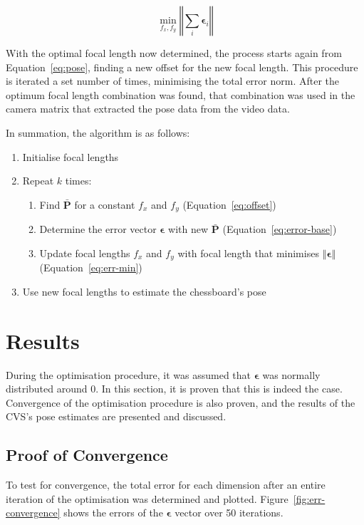 \begin{equation}
  \label{eq:err-min}
  \min_{f_x, f_y}\left \Vert \sum_i  \bm{\epsilon}_i \right \Vert
\end{equation}

With the optimal focal length now determined, the process starts again from Equation~\ref{eq:pose}, finding a new offset for the new focal length. This procedure is iterated a set number of times, minimising the total error norm. After the optimum focal length combination was found, that combination was used in the camera matrix that extracted the pose data from the video data.

In summation, the algorithm is as follows:

\begin{enumerate}
  \item Initialise focal lengths
  \item Repeat $k$ times:
  \begin{enumerate}
    \item Find $\bar{\bm{P}}$ for a constant $f_x$ and $f_y$ (Equation~\ref{eq:offset})
    \item Determine the error vector $\bm{\epsilon}$ with new $\bar{\bm{P}}$ (Equation~\ref{eq:error-base})
    \item Update focal lengths $f_x$ and $f_y$ with focal length that minimises $\left \Vert \bm{\epsilon} \right \Vert$ (Equation~\ref{eq:err-min})
  \end{enumerate}
  \item Use new focal lengths to estimate the chessboard's pose
\end{enumerate}

\section{Results}

During the optimisation procedure, it was assumed that $\bm{\epsilon}$ was normally distributed around 0. In this section, it is proven that this is indeed the case. Convergence of the optimisation procedure is also proven, and the results of the CVS's pose estimates are presented and discussed.

\subsection{Proof of Convergence}

To test for convergence, the total error for each dimension after an entire iteration of the optimisation was determined and plotted. Figure~\ref{fig:err-convergence} shows the errors of the $\bm{\epsilon}$ vector over 50 iterations.

